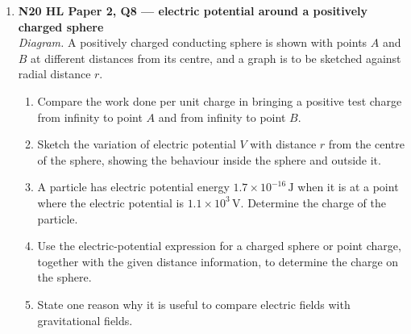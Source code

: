 \documentclass[11pt]{article}
\begin{document}
\begin{enumerate}[leftmargin=*, itemsep=1.1em]
\item \textbf{N20 HL Paper 2, Q8 --- electric potential around a positively charged sphere}\\
\textit{Diagram.} A positively charged conducting sphere is shown with points $A$ and $B$ at different distances from its centre, and a graph is to be sketched against radial distance $r$.
\begin{enumerate}[label=(\alph*)]
\item Compare the work done per unit charge in bringing a positive test charge from infinity to point $A$ and from infinity to point $B$.
\item Sketch the variation of electric potential $V$ with distance $r$ from the centre of the sphere, showing the behaviour inside the sphere and outside it.
\item A particle has electric potential energy $1.7\times10^{-16}\,\text{J}$ when it is at a point where the electric potential is $1.1\times10^{3}\,\text{V}$. Determine the charge of the particle.
\item Use the electric-potential expression for a charged sphere or point charge, together with the given distance information, to determine the charge on the sphere.
\item State one reason why it is useful to compare electric fields with gravitational fields.
\end{enumerate}

\end{enumerate}
\end{document}

